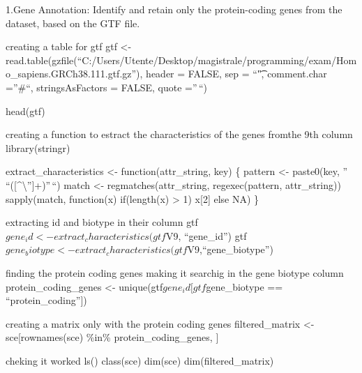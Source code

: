\documentclass[
  ignorenonframetext,
]{beamer}
\begin{document}
\begin{frame}{1.Gene Annotation: Identify and retain only the
protein-coding genes from the dataset, based on the GTF file.}
\label{gene-annotation-identify-and-retain-only-the-protein-coding-genes-from-the-dataset-based-on-the-gtf-file.}
\begin{block}{creating a table for gtf}
\label{creating-a-table-for-gtf}
gtf
\textless-read.table(gzfile(``C:/Users/Utente/Desktop/magistrale/programming/exam/Homo\_sapiens.GRCh38.111.gtf.gz''),
header = FALSE, sep = ``\t", comment.char =''\#``, stringsAsFactors =
FALSE, quote =''\,``)

head(gtf)
\end{block}

\begin{block}{creating a function to estract the characteristics of the
genes fromthe 9th column}
\label{creating-a-function-to-estract-the-characteristics-of-the-genes-fromthe-9th-column}
library(stringr)

extract\_characteristics \textless- function(attr\_string, key) \{
pattern \textless- paste0(key, '' ``({[}\^{}\textbackslash''{]}+)''\,``)
match \textless- regmatches(attr\_string, regexec(pattern,
attr\_string)) sapply(match, function(x) if(length(x) \textgreater{} 1)
x{[}2{]} else NA) \}
\end{block}

\begin{block}{extracting id and biotype in their column}
\label{extracting-id-and-biotype-in-their-column}
gtf\(gene_id <- extract_characteristics(gtf\)V9, ``gene\_id'')
gtf\(gene_biotype <- extract_characteristics(gtf\)V9,``gene\_biotype'')
\end{block}

\begin{block}{finding the protein coding genes making it searchig in the
gene biotype column}
\label{finding-the-protein-coding-genes-making-it-searchig-in-the-gene-biotype-column}
protein\_coding\_genes \textless- unique(gtf\(gene_id[gtf\)gene\_biotype
== ``protein\_coding''{]})
\end{block}

\begin{block}{creating a matrix only with the protein coding genes}
\label{creating-a-matrix-only-with-the-protein-coding-genes}
filtered\_matrix \textless- sce{[}rownames(sce) \%in\%
protein\_coding\_genes, {]}
\end{block}

\begin{block}{cheking it worked}
\label{cheking-it-worked}
ls() class(sce) dim(sce) dim(filtered\_matrix)
\end{block}
\end{frame}
\end{document}
